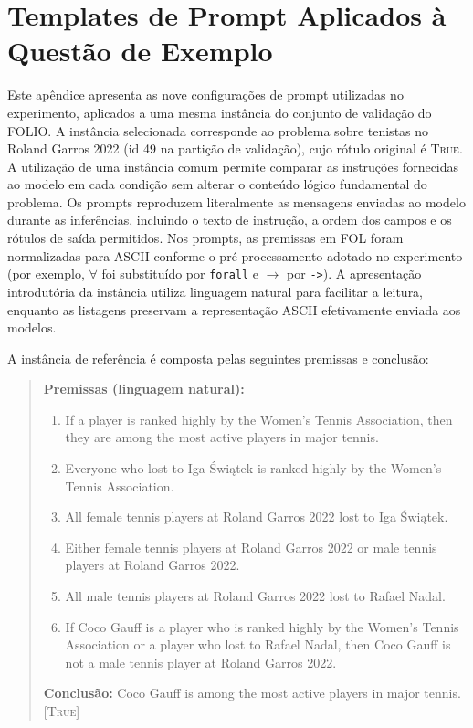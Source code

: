 \clearpage
\appendix


\section{Templates de Prompt Aplicados à Questão de Exemplo}
\label{ap:templates-prompts}

Este apêndice apresenta as nove configurações de prompt utilizadas no experimento,
aplicados a uma mesma instância do conjunto de validação do FOLIO. A instância
selecionada corresponde ao problema sobre tenistas no Roland Garros 2022 (id 49
na partição de validação), cujo rótulo original é \textsc{True}. A utilização
de uma instância comum permite comparar as instruções fornecidas ao modelo em
cada condição sem alterar o conteúdo lógico fundamental do problema. Os prompts
reproduzem literalmente as mensagens enviadas ao modelo durante as inferências,
incluindo o texto de instrução, a ordem dos campos e os rótulos de saída
permitidos. Nos prompts, as premissas em FOL foram normalizadas para ASCII
conforme o pré-processamento adotado no experimento (por exemplo,
$\forall$ foi substituído por \texttt{forall} e $\rightarrow$ por
\texttt{->}). A apresentação introdutória da instância utiliza linguagem natural
para facilitar a leitura, enquanto as listagens preservam a representação ASCII
efetivamente enviada aos modelos.

A instância de referência é composta pelas seguintes premissas e conclusão:

\begin{quote}
\textbf{Premissas (linguagem natural):}
\begin{enumerate}
  \item If a player is ranked highly by the Women's Tennis Association, then
        they are among the most active players in major tennis.
  \item Everyone who lost to Iga Świątek is ranked highly by the Women's
        Tennis Association.
  \item All female tennis players at Roland Garros 2022 lost to Iga Świątek.
  \item Either female tennis players at Roland Garros 2022 or male tennis
        players at Roland Garros 2022.
  \item All male tennis players at Roland Garros 2022 lost to Rafael Nadal.
  \item If Coco Gauff is a player who is ranked highly by the Women's Tennis
        Association or a player who lost to Rafael Nadal, then Coco Gauff is
        not a male tennis player at Roland Garros 2022.
\end{enumerate}
\textbf{Conclusão:} Coco Gauff is among the most active players in major
tennis. \quad \textsc{[True]}
\end{quote}

